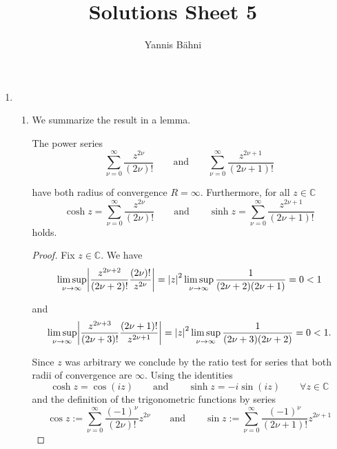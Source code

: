 

\title{Solutions Sheet 5}
\author{Yannis B\"{a}hni}
\address[Yannis B\"{a}hni]{University of Zurich, R\"{a}mistrasse 71, 8006 Zurich}


\maketitle
\thispagestyle{fancy}
\begin{enumerate}[label = \textbf{Exercise \arabic*.},wide = 0pt, itemsep=1.5ex]
	\item 
		~
	\begin{enumerate}[label = (\alph*),wide = 0pt, itemsep=1.5ex]
		\item We summarize the result in a lemma. 
			\begin{lemma}
				The power series
				\begin{equation}
					\sum_{\nu = 0}^\infty \frac{z^{2\nu}}{(2\nu)!} \qquad \text{and} \qquad \sum_{\nu = 0}^\infty \frac{z^{2\nu + 1}}{(2\nu + 1)!}
				\end{equation}

				\noindent have both radius of convergence $R = \infty$. Furthermore, for all $z \in \mathbb{C}$
				\begin{equation}
					\cosh z = \sum_{\nu = 0}^\infty \frac{z^{2\nu}}{(2\nu)!} \qquad \text{and} \qquad \sinh z = \sum_{\nu = 0}^\infty \frac{z^{2\nu + 1}}{(2\nu + 1)!}
				\end{equation}
				\noindent holds.
				\label{lem:pow_cosh}
			\end{lemma}

			\begin{proof}
				Fix $z \in \mathbb{C}$. We have 
			\begin{equation}
				\limsup_{\nu \to \infty} \abs[3]{\frac{z^{2\nu + 2}}{(2\nu + 2)!} \frac{(2\nu)!}{z^{2\nu}}} = \abs[0]{z}^2\limsup_{\nu \to \infty} \frac{1}{(2\nu + 2)(2\nu + 1)} = 0 < 1
			\end{equation}

			\noindent and
			\begin{equation}
			\limsup_{\nu \to \infty} \abs[3]{\frac{z^{2\nu + 3}}{(2\nu + 3)!} \frac{(2\nu + 1)!}{z^{2\nu + 1}}} = \abs[0]{z}^2\limsup_{\nu \to \infty} \frac{1}{(2\nu + 3)(2\nu + 2)} = 0 < 1.
			\end{equation}

			Since $z$ was arbitrary we conclude by the ratio test for series that both radii of convergence are $\infty$. Using the identities 
			\begin{equation}
				\cosh z = \cos(iz) \qquad \text{and} \qquad \sinh z = -i\sin(iz) \qquad \forall z \in \mathbb{C}
			\end{equation}
			\noindent and the definition of the trigonometric functions by series
			\begin{equation}
				\cos z := \sum_{\nu = 0}^\infty \frac{(-1)^\nu}{(2\nu)!}z^{2\nu} \qquad \text{and} \qquad \sin z := \sum_{\nu = 0}^\infty \frac{(-1)^{\nu}}{(2\nu + 1)!}z^{2\nu + 1}
			\end{equation}


\end{proof}
\end{enumerate}
\end{enumerate}
